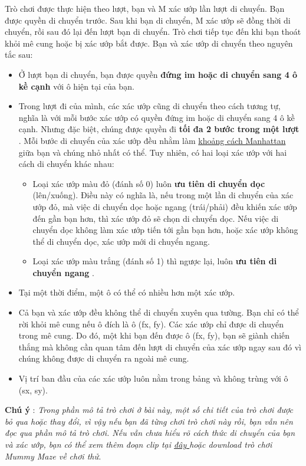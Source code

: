 Trò chơi được thực hiện theo lượt, bạn và M xác ướp lần lượt di chuyển. Bạn được quyền di chuyển trước. Sau khi bạn di chuyển, M xác ướp sẽ đồng thời di chuyển, rồi sau đó lại đến lượt bạn di chuyển. Trò chơi tiếp tục đến khi bạn thoát khỏi mê cung hoặc bị xác ướp bắt được. Bạn và xác ướp di chuyển theo nguyên tắc sau:
\begin{itemize}
	\item Ở lượt bạn di chuyển, bạn được quyền \textbf{ đứng im hoặc di chuyển sang 4 ô kề cạnh } với ô hiện tại của bạn.
	\item Trong lượt đi của mình, các xác ướp cũng di chuyển theo cách tương tự, nghĩa là với mỗi bước xác ướp có quyền đứng im hoặc di chuyển sang 4 ô kề cạnh. Nhưng đặc biệt, chúng được quyền đi \textbf{ tối đa 2 bước trong một lượt } . Mỗi bước di chuyển của xác ướp đều nhằm làm \href{http://vi.wikipedia.org/wiki/Kho%E1%BA%A3ng_c%C3%A1ch_Manhattan}{ khoảng cách Manhattan } giữa bạn và chúng nhỏ nhất có thể. Tuy nhiên, có hai loại xác ướp với hai cách di chuyển khác nhau:
\begin{itemize}
	\item Loại xác ướp màu đỏ (đánh số 0) luôn \textbf{ ưu tiên di chuyển dọc } (lên/xuống). Điều này có nghĩa là, nếu trong một lần di chuyển của xác ướp đỏ, mà việc di chuyển dọc hoặc ngang (trái/phải) đều khiến xác ướp đến gần bạn hơn, thì xác ướp đỏ sẽ chọn di chuyển dọc. Nếu việc di chuyển dọc không làm xác ướp tiến tới gần bạn hơn, hoặc xác ướp không thể di chuyển dọc, xác ướp mới di chuyển ngang.
	\item Loại xác ướp màu trắng (đánh số 1) thì ngược lại, luôn \textbf{ ưu tiên di chuyển ngang } .
\end{itemize}
	\item Tại một thời điểm, một ô có thể có nhiều hơn một xác ướp.
	\item Cả bạn và xác ướp đều không thể di chuyển xuyên qua tường. Bạn chỉ có thể rời khỏi mê cung nếu ô đích là ô (fx, fy). Các xác ướp chỉ được di chuyển trong mê cung. Do đó, một khi bạn đến được ô (fx, fy), bạn sẽ giành chiến thắng mà không cần quan tâm đến lượt di chuyển của xác ướp ngay sau đó vì chúng không được di chuyển ra ngoài mê cung.
	\item Vị trí ban đầu của các xác ướp luôn nằm trong bảng và không trùng với ô (sx, sy).
\end{itemize}

\textbf{Chú ý } : \emph{ Trong phần mô tả trò chơi ở bài này, một số chi tiết của trò chơi được bỏ qua hoặc thay đổi, vì vậy nếu bạn đã từng chơi trò chơi này rồi, bạn vẫn nên đọc qua phần mô tả trò chơi. Nếu vẫn chưa hiểu rõ cách thức di chuyển của bạn và xác ướp, bạn có thể xem thêm đoạn clip tại \href{http://www.youtube.com/watch?v=GR3LlbRKf5w}{ đây } hoặc download trò chơi Mummy Maze về chơi thử. }

